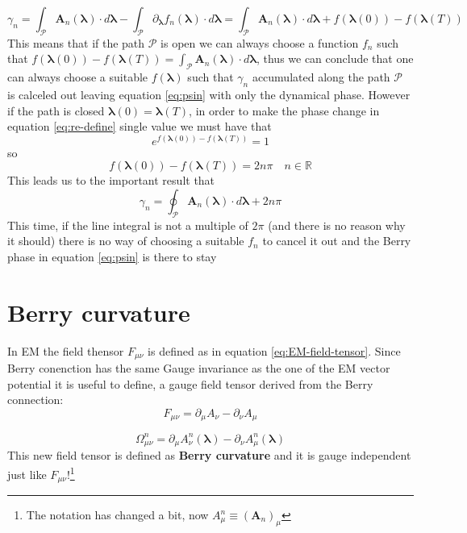 \documentclass[11pt,a4paper]{report}
\theoremstyle{definition}
\theoremstyle{plain}
\theoremstyle{plain}
\begin{document}
		\[
			\gamma_n=\int_\mathcal{P} \mathbf A_n(\boldsymbol \lambda) \cdot d\boldsymbol \lambda - \int_\mathcal{P} \partial_{\boldsymbol \lambda}f_n(\boldsymbol \lambda) \cdot d\boldsymbol \lambda= \int_\mathcal{P} \mathbf A_n(\boldsymbol \lambda) \cdot d\boldsymbol \lambda + f(\boldsymbol \lambda(0))-f(\boldsymbol \lambda (T))
		\]
		This means that if the path $\mathcal{P}$ is open we can always choose a function $f_n$ such that 
		$f(\boldsymbol \lambda(0))-f(\boldsymbol \lambda(T))=\int_\mathcal{P} \mathbf A_n(\boldsymbol \lambda) \cdot d\boldsymbol \lambda$, 
		thus we can conclude that one can always choose a suitable $f(\boldsymbol \lambda)$ such that $\gamma_n$ accumulated along the path $\mathcal P$ is calceled out leaving equation 
		\ref{eq:psin} with only the dynamical phase. 
		However if the path is closed $\boldsymbol \lambda(0)=\boldsymbol \lambda(T)$, in order to make the phase change
		in equation \ref{eq:re-define} single value we must have that
		\[
		e^{f(\boldsymbol \lambda(0))-f(\boldsymbol \lambda(T))}=1
		\]
		so 
		\[
			f(\boldsymbol \lambda(0))-f(\boldsymbol \lambda(T))=2n\pi \quad n\in \mathbb{R}
		\]
		This leads us to the important result that
		\begin{equation}
			\label{eq:closed-berry}
			\gamma_n=\oint_{\mathcal P} \mathbf A_n(\boldsymbol \lambda)\cdot d\boldsymbol \lambda + 2n\pi
		\end{equation}
		This time, if the line integral is not a multiple of $2\pi$ (and there is no reason why it should) there is no way of choosing a suitable $f_n$ to
		cancel it out and the Berry phase in equation \ref{eq:psin} is there to stay
	


	\section{Berry curvature}
		In EM the field thensor $F_{\mu\nu}$ is defined as in equation \ref{eq:EM-field-tensor}.
		Since Berry conenction has the same Gauge invariance as the one of the EM vector potential it is useful to define, a gauge field tensor derived from the Berry connection:
		\begin{equation}
			\label{eq:EM-field-tensor}
			F_{\mu\nu}=\partial_\mu A_\nu-\partial_\nu A_\mu
		\end{equation}
	
		\begin{equation}
			\label{eq:berry-curvature1}
				\Omega_{\mu\nu}^n =\partial_\mu A^n_\nu(\boldsymbol \lambda) - \partial_\nu A^n_\mu(\boldsymbol \lambda)
		\end{equation}
		This new field tensor is defined as \textbf{Berry curvature} and it is gauge independent just like 
		$F_{\mu\nu}$!\footnote{The notation has changed a bit, now $A_\mu^n\equiv (\mathbf A_n)_\mu$}
		
\end{document}

